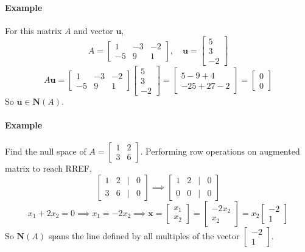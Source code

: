 \documentclass[../linear-algebra.tex]{subfiles}
\begin{document}
\paragraph{Example} For this matrix $A$ and vector $\mathbf{u}$,
\[A = \begin{bmatrix} 1 & -3 & -2 \\ -5 & 9 & 1 \end{bmatrix}, \quad \mathbf{u} = \begin{bmatrix} 5 \\ 3 \\ -2 \end{bmatrix}\]
\[A \mathbf{u} = \begin{bmatrix} 1 & -3 & -2 \\ -5 & 9 & 1 \end{bmatrix} \begin{bmatrix} 5 \\ 3 \\ -2 \end{bmatrix} = \begin{bmatrix} 5 - 9 + 4 \\ -25 + 27 - 2 \end{bmatrix} = \begin{bmatrix} 0 \\ 0 \end{bmatrix}\]
So $\mathbf{u} \in \mathbf{N}(A)$.

\paragraph{Example} Find the null space of $A = \begin{bmatrix} 1 & 2 \\ 3 & 6 \end{bmatrix}$.\newline
Performing row operations on augmented matrix to reach RREF,
\[\begin{bmatrix} 1 & 2 & \big| & 0 \\ 3 & 6 & \big| & 0 \end{bmatrix} \implies \begin{bmatrix} 1 & 2 & \big| & 0 \\ 0 & 0 & \big| & 0 \end{bmatrix}\]
\[x_1 + 2x_2 = 0 \implies x_1 = -2x_2 \implies \mathbf{x} = \begin{bmatrix} x_1 \\ x_2 \end{bmatrix} = \begin{bmatrix} -2x_2 \\ x_2 \end{bmatrix} = x_2 \begin{bmatrix} -2 \\ 1 \end{bmatrix}\]
So $\mathbf{N}(A)$ spans the line defined by all multiples of the vector $\begin{bmatrix} -2 \\ 1 \end{bmatrix}$.
\end{document}
